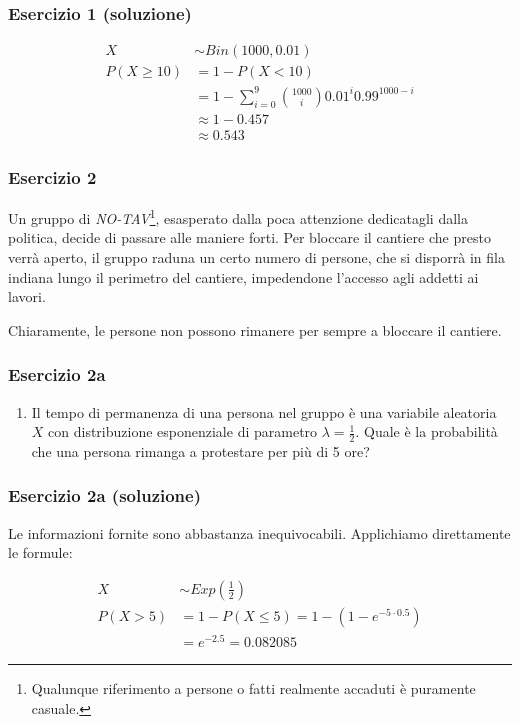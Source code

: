 \documentclass{beamer}
\begin{document}
\begin{frame}[fragile]
	\frametitle{Esercizio 1 (soluzione)}

	\begin{align*}
	    X & \sim Bin(1000, 0.01) \\
		P(X \geq 10) & = 1 - P(X < 10) \\
		& = 1 - \sum_{i=0}^9 \binom{1000}{i} 0.01^i 0.99^{1000-i} \\ 
		& \approx 1 - 0.457 \\
		& \approx 0.543
	\end{align*}

\end{frame}

\begin{frame}[fragile]
	\frametitle{Esercizio 2}

	Un gruppo di \textit{NO-TAV}\footnote{Qualunque riferimento a persone o fatti realmente accaduti è puramente casuale.}, esasperato dalla poca attenzione dedicatagli dalla politica, decide di passare alle maniere forti. Per bloccare il cantiere che presto verrà aperto, il gruppo raduna un certo numero di persone, che si disporrà in fila indiana lungo il perimetro del cantiere, impedendone l'accesso agli addetti ai lavori.

	Chiaramente, le persone non possono rimanere per sempre a bloccare il cantiere. 
\end{frame}

\begin{frame}[fragile]
	\frametitle{Esercizio 2a}

	\begin{enumerate}[a]
		\item Il tempo di permanenza di una persona nel gruppo è una variabile aleatoria $X$ con distribuzione esponenziale di parametro $\lambda = \frac{1}{2}$. Quale è la probabilità che una persona rimanga a protestare per più di 5 ore?
	\end{enumerate}
\end{frame}


\begin{frame}[fragile]
	\frametitle{Esercizio 2a (soluzione)}

	Le informazioni fornite sono abbastanza inequivocabili. Applichiamo direttamente le formule:

	\begin{align*}
		X & \sim Exp(\frac{1}{2}) \\
		P(X > 5) & = 1 - P(X \leq 5) = 1 - (1 - e^{-5 \cdot 0.5}) \\
		& = e^{-2.5} = 0.082085
	\end{align*}

\end{frame}
\end{document}
